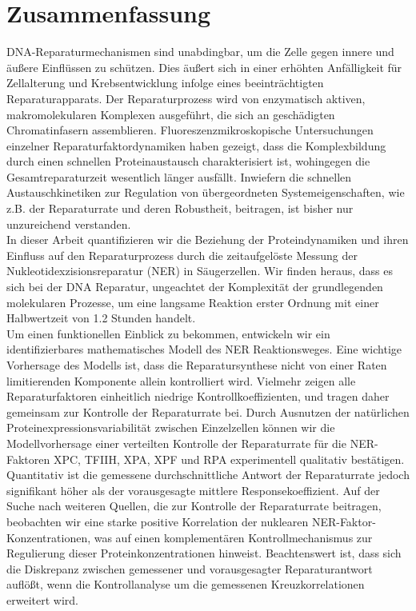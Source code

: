 \chapter*{Zusammenfassung}
\thispagestyle{plain2}


DNA-Reparaturmechanismen sind unabdingbar, um die Zelle gegen innere und \"{a}u\ss{}ere Einfl\"{u}ssen zu sch\"{u}tzen. Dies \"{a}u\ss{}ert sich in einer erh\"{o}hten Anf\"{a}lligkeit f\"{u}r Zellalterung und Krebsentwicklung infolge eines beeintr\"{a}chtigten Reparaturapparats. Der Reparaturprozess wird von enzymatisch aktiven, makromolekularen Komplexen ausgef\"{u}hrt, die sich an gesch\"{a}digten Chromatinfasern assemblieren. Fluoreszenzmikroskopische Untersuchung\-en einzelner Reparaturfaktordynamiken haben gezeigt, dass die Komplexbildung durch einen schnellen Proteinaustausch charakterisiert ist, wohingegen die Gesamtreparaturzeit wesentlich l\"{a}nger ausf\"{a}llt. Inwiefern die schnellen Austauschkinetiken zur Regulation von \"{u}bergeordneten Systemeigenschaften, wie z.B. der Reparaturrate und deren Robustheit, beitragen, ist bisher nur unzureichend verstanden.\\
In dieser Arbeit quantifizieren wir die Beziehung der Proteindynamiken und ihren Einfluss auf den Reparaturprozess durch die zeitaufgel\"{o}ste Messung der Nukleotidexzisionsreparatur (NER) in S\"{a}ugerzellen. Wir finden heraus, dass es sich bei der DNA Reparatur, ungeachtet der Komplexit\"{a}t der grundlegenden molekularen Prozesse, um eine langsame Reaktion erster Ordnung mit einer Halb\-wertzeit von 1.2 Stunden handelt.\\  
Um einen funktionellen Einblick zu bekommen, entwickeln wir ein identifizierbares ma\-the\-matisches Modell des NER Reaktionsweges. Eine wichtige Vorhersage des Modells ist, dass die Reparatursynthese nicht von einer Raten limitierenden Komponente allein kontrolliert wird. Vielmehr zeigen alle Reparaturfaktoren einheitlich niedrige Kontrollkoeffizienten, und tragen daher gemeinsam zur Kontrolle der Reparaturrate bei. Durch Ausnutzen der nat\"{u}rlichen Proteinexpressionsvariabilit\"{a}t zwischen Einzelzellen k\"{o}nnen wir die Modellvorhersage einer verteilten Kontrolle der Reparaturrate f\"{u}r die NER-Faktoren XPC, TFIIH, XPA, XPF und RPA experimentell qualitativ best\"{a}tigen. Quantitativ ist die gemessene durchschnittliche Antwort der Reparaturrate jedoch signifikant h\"{o}her als der vorausgesagte mittlere Responsekoeffizient. Auf der Suche nach weiteren Quellen, die zur Kontrolle der Reparaturrate beitragen, beobachten wir eine starke positive Korrelation der nu\-klearen NER-Faktor-Konzentrationen, was auf einen komplement\"{a}ren Kontrollmechanismus zur Regulierung dieser Proteinkonzentrationen hinweist. Beachtenswert ist, dass sich die Diskrepanz zwischen gemessener und vorausgesagter Reparaturantwort aufl\"{o}\ss{}t, wenn die Kontrollanalyse um die gemessenen Kreuzkorrelationen erweitert wird.\\              
